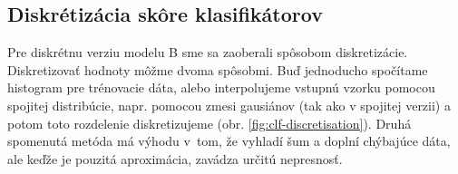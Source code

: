 

\subsection{Diskrétizácia skôre klasifikátorov}

Pre diskrétnu verziu modelu B sme sa zaoberali spôsobom diskretizácie.
Diskretizovať hodnoty môžme dvoma spôsobmi. Buď jednoducho spočítame histogram pre trénovacie dáta, alebo interpolujeme vstupnú vzorku pomocou spojitej distribúcie, napr. pomocou zmesi gausiánov (tak ako v spojitej verzii) a potom toto rozdelenie diskretizujeme (obr. \ref{fig:clf-discretisation}). Druhá spomenutá metóda má výhodu v~tom, že vyhladí šum a doplní chýbajúce dáta, ale keďže je pouzitá aproximácia, zavádza určitú nepresnosť.

